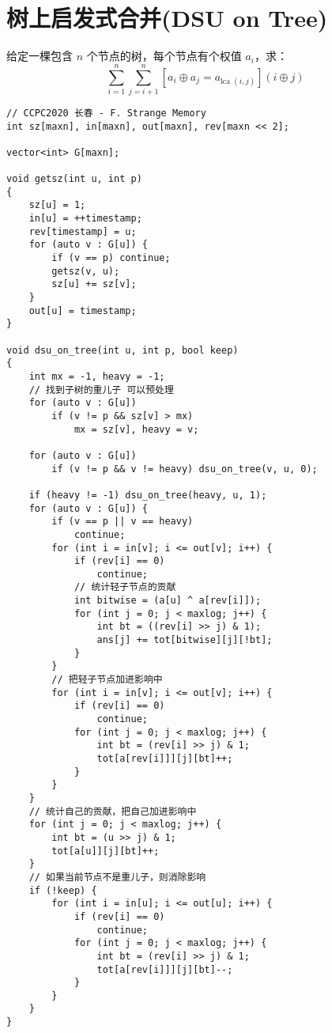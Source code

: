 \section{树上启发式合并(DSU on Tree)}
\begin{tcolorbox}
\par \noindent 给定一棵包含 $n$ 个节点的树，每个节点有个权值 $a_i$，求：
$$
\sum_{i=1}^n \sum_{j=i+1}^n\left[a_i \oplus a_j=a_{\text {lca }(i, j)}\right](i \oplus j)
$$
\end{tcolorbox}
\begin{verbatim}
// CCPC2020 长春 - F. Strange Memory
int sz[maxn], in[maxn], out[maxn], rev[maxn << 2];

vector<int> G[maxn];

void getsz(int u, int p)
{
    sz[u] = 1;
    in[u] = ++timestamp;
    rev[timestamp] = u;
    for (auto v : G[u]) {
        if (v == p) continue;
        getsz(v, u);
        sz[u] += sz[v];
    }
    out[u] = timestamp;
}

void dsu_on_tree(int u, int p, bool keep)
{
    int mx = -1, heavy = -1;
    // 找到子树的重儿子 可以预处理
    for (auto v : G[u])
        if (v != p && sz[v] > mx)
            mx = sz[v], heavy = v;

    for (auto v : G[u])
        if (v != p && v != heavy) dsu_on_tree(v, u, 0);
        
    if (heavy != -1) dsu_on_tree(heavy, u, 1);
    for (auto v : G[u]) {
        if (v == p || v == heavy)
            continue;
        for (int i = in[v]; i <= out[v]; i++) {
            if (rev[i] == 0)
                continue;
            // 统计轻子节点的贡献
            int bitwise = (a[u] ^ a[rev[i]]);
            for (int j = 0; j < maxlog; j++) {
                int bt = ((rev[i] >> j) & 1);
                ans[j] += tot[bitwise][j][!bt];
            }
        }
        // 把轻子节点加进影响中
        for (int i = in[v]; i <= out[v]; i++) {
            if (rev[i] == 0)
                continue;
            for (int j = 0; j < maxlog; j++) {
                int bt = (rev[i] >> j) & 1;
                tot[a[rev[i]]][j][bt]++;
            }
        }
    }
    // 统计自己的贡献，把自己加进影响中
    for (int j = 0; j < maxlog; j++) {
        int bt = (u >> j) & 1;
        tot[a[u]][j][bt]++;
    }
    // 如果当前节点不是重儿子，则消除影响
    if (!keep) {
        for (int i = in[u]; i <= out[u]; i++) {
            if (rev[i] == 0)
                continue;
            for (int j = 0; j < maxlog; j++) {
                int bt = (rev[i] >> j) & 1;
                tot[a[rev[i]]][j][bt]--;
            }
        }
    }
}
\end{verbatim}
